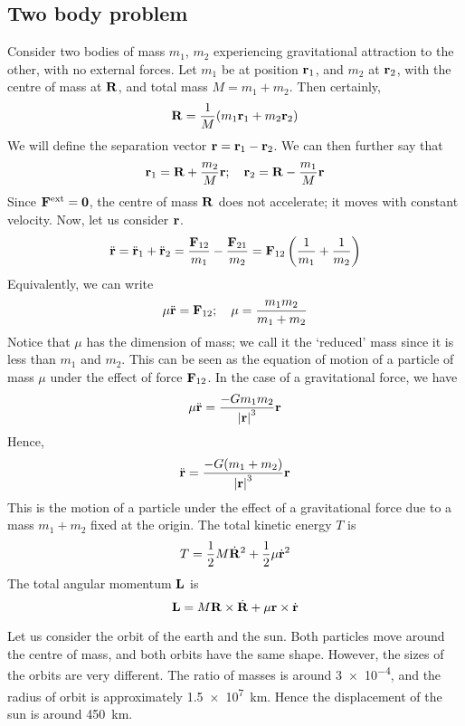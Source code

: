 \subsection{Two body problem}
Consider two bodies of mass \(m_1\), \(m_2\) experiencing gravitational attraction to the other, with no external forces.
Let \(m_1\) be at position \(\vb r_1\), and \(m_2\) at \(\vb r_2\), with the centre of mass at \(\vb R\), and total mass \(M = m_1 + m_2\).
Then certainly,
\[
	\vb R = \frac{1}{M}(m_1 \vb r_1 + m_2 \vb r_2)
\]
We will define the separation vector \(\vb r = \vb r_1 - \vb r_2\).
We can then further say that
\[
	\vb r_1 = \vb R + \frac{m_2}{M}\vb r;\quad \vb r_2 = \vb R - \frac{m_1}{M}\vb r
\]
Since \(\vb F^\text{ext} = \vb 0\), the centre of mass \(\vb R\) does not accelerate; it moves with constant velocity.
Now, let us consider \(\vb r\).
\[
	\ddot{\vb{r}} = \ddot{\vb{r}}_1 + \ddot{\vb{r}}_2 = \frac{\vb F_{12}}{m_1} - \frac{\vb F_{21}}{m_2} = \vb F_{12} \left( \frac{1}{m_1} + \frac{1}{m_2} \right)
\]
Equivalently, we can write
\[
	\mu\ddot{\vb{r}} = \vb F_{12};\quad \mu = \frac{m_1 m_2}{m_1 + m_2}
\]
Notice that \(\mu\) has the dimension of mass; we call it the `reduced' mass since it is less than \(m_1\) and \(m_2\).
This can be seen as the equation of motion of a particle of mass \(\mu\) under the effect of force \(\vb F_{12}\).
In the case of a gravitational force, we have
\[
	\mu \ddot{\vb{r}} = \frac{-Gm_1m_2}{\abs{\vb r}^3}\vb r
\]
Hence,
\[
	\ddot{\vb{r}} = \frac{-G(m_1 + m_2)}{\abs{\vb r}^3}\vb r
\]
This is the motion of a particle under the effect of a gravitational force due to a mass \(m_1 + m_2\) fixed at the origin.
The total kinetic energy \(T\) is
\[
	T = \frac{1}{2}M\dot {\vb R}^2 + \frac{1}{2}\mu \dot{\vb{r}}^2
\]
The total angular momentum \(\vb L\) is
\[
	\vb L = M \vb R \times \dot{\vb R} + \mu \vb r \times \dot{\vb r}
\]

\begin{example}
	Let us consider the orbit of the earth and the sun.
	Both particles move around the centre of mass, and both orbits have the same shape.
	However, the sizes of the orbits are very different.
	The ratio of masses is around \num{3e-4}, and the radius of orbit is approximately \SI{1.5e7}{\kilo\metre}.
	Hence the displacement of the sun is around \SI{450}{\kilo\metre}.
\end{example}

